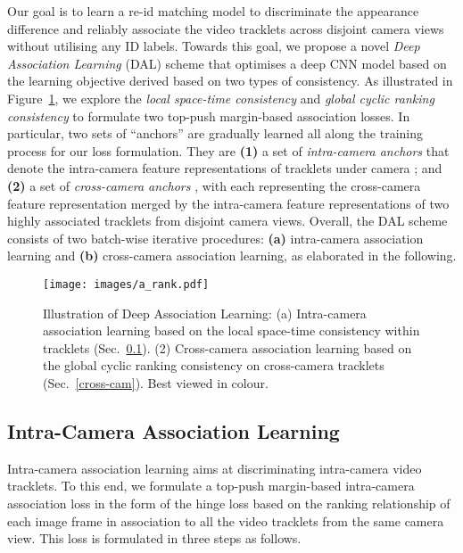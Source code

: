\documentclass{bmvc2k}
\begin{document}
Our goal is to learn a re-id matching model to discriminate the
appearance difference and reliably associate the video tracklets
across disjoint camera views without utilising any ID labels. Towards this goal, we propose a novel {\em Deep Association Learning} (DAL)
scheme that optimises a deep CNN model based on the learning objective derived based on two types of consistency. As illustrated in Figure~\ref{fig:a_rank}, we explore the {\em local
  space-time consistency} and {\em global cyclic ranking consistency}
to formulate two top-push margin-based association losses. 
In particular, two sets of ``anchors'' are gradually learned all along the training process for our loss formulation. They are {\bf (1)} a set of {\em intra-camera anchors}
 that denote the intra-camera feature
representations of  tracklets under camera ; and {\bf (2)} a
set of {\em cross-camera anchors} , with each
representing the cross-camera feature representation merged by the
intra-camera feature representations of two highly associated
tracklets from disjoint camera views. 
Overall, the DAL scheme consists of two batch-wise iterative
procedures: {\bf (a)} intra-camera association learning and {\bf (b)}
cross-camera association learning, as elaborated in the following. 

\begin{figure}[!t]
\centering
\texttt{[image: images/a\_rank.pdf]}
\vspace{1.0em}
\caption{Illustration of Deep Association Learning:
	(a) Intra-camera association learning based on the local
	space-time consistency within tracklets (Sec.~\ref{intra-cam}). 
	(2) Cross-camera association learning based on the {global cyclic ranking consistency} on cross-camera tracklets (Sec.~\ref{cross-cam}).
	Best viewed in colour.
}
\label{fig:a_rank}
\vspace{-0.5em}
\end{figure}

\vspace{-0.2cm}
\subsection{Intra-Camera Association Learning}
\label{intra-cam}


Intra-camera association learning aims at discriminating intra-camera video tracklets. 
To this end, we formulate a top-push margin-based intra-camera association loss 
in the form of the hinge loss based on
the ranking relationship of each image frame in association to all the 
video tracklets from the same camera view. 
This loss is formulated in three steps as follows.
\end{document}
